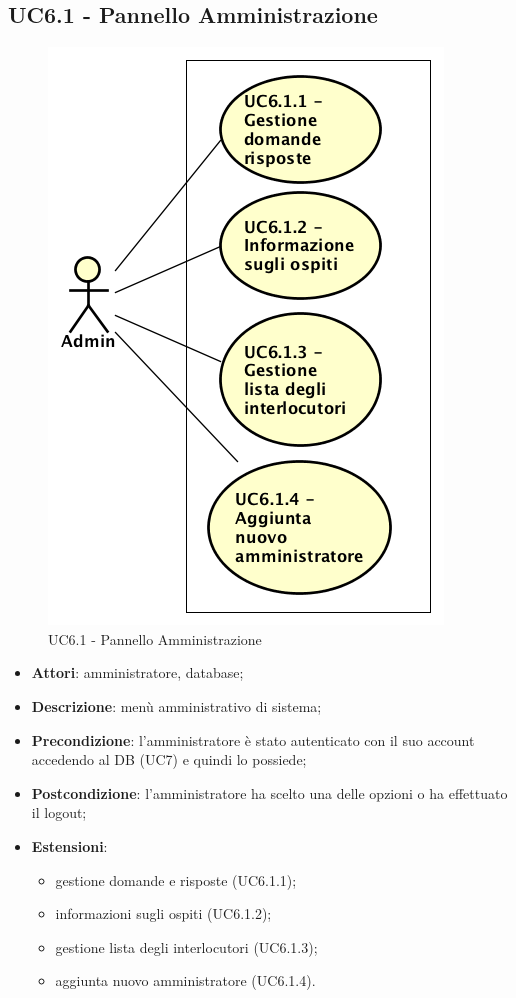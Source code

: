 \documentclass[../AnalisiDeiRequisiti.tex]{subfiles}
\begin{document}
\subsection{UC6.1 - Pannello Amministrazione}
\begin{figure}[!h]
	\centering
	\includegraphics[scale=0.7]{UseCases/UC6-Amministrazione/Immagini/UCMenu.png}
	\caption{UC6.1 - Pannello Amministrazione}
\end{figure}	
\label{sssec:UC6.1} 
\begin{itemize} 
\item \textbf{Attori}: amministratore, database;
\item \textbf{Descrizione}: menù amministrativo di sistema;
\item \textbf{Precondizione}: l'amministratore è stato autenticato con il suo account accedendo al DB (UC7) e quindi lo possiede;
\item \textbf{Postcondizione}: l'amministratore ha scelto una delle opzioni o ha effettuato il logout;
\item \textbf{Estensioni}:\begin{itemize}\item gestione domande e risposte (UC6.1.1);\item informazioni sugli ospiti (UC6.1.2);\item gestione lista degli interlocutori (UC6.1.3);\item aggiunta nuovo amministratore (UC6.1.4).\end{itemize}
\end{itemize}
\newpage
\end{document}
